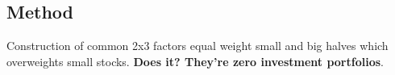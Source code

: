 
\subsection{Method}

Construction of common 2x3 factors equal weight small and big halves which 
overweights small stocks. \textbf{Does it? They're zero investment portfolios}.
